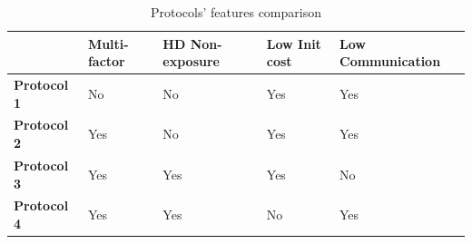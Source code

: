 \begin{table}[h!]
\centering
\caption{Protocols' features comparison}
\label{my-label}
\begin{tabular}{lllll}
\hline
                                          & \textbf{Multi-factor}    & \textbf{HD Non-exposure} & \textbf{Low Init cost} & \textbf{Low Communication} \\ \hline
\multicolumn{1}{|l|}{\textbf{Protocol 1}} & \multicolumn{1}{l|}{No}  & \multicolumn{1}{l|}{No}        & \multicolumn{1}{l|}{Yes}   & \multicolumn{1}{l|}{Yes}   \\ \hline
\multicolumn{1}{|l|}{\textbf{Protocol 2}} & \multicolumn{1}{l|}{Yes} & \multicolumn{1}{l|}{No}        & \multicolumn{1}{l|}{Yes}   & \multicolumn{1}{l|}{Yes}   \\ \hline
\multicolumn{1}{|l|}{\textbf{Protocol 3}} & \multicolumn{1}{l|}{Yes} & \multicolumn{1}{l|}{Yes}       & \multicolumn{1}{l|}{Yes}   & \multicolumn{1}{l|}{No}    \\ \hline
\multicolumn{1}{|l|}{\textbf{Protocol 4}} & \multicolumn{1}{l|}{Yes} & \multicolumn{1}{l|}{Yes}       & \multicolumn{1}{l|}{No}    & \multicolumn{1}{l|}{Yes}   \\ \hline
\end{tabular}
\end{table}
    
          




